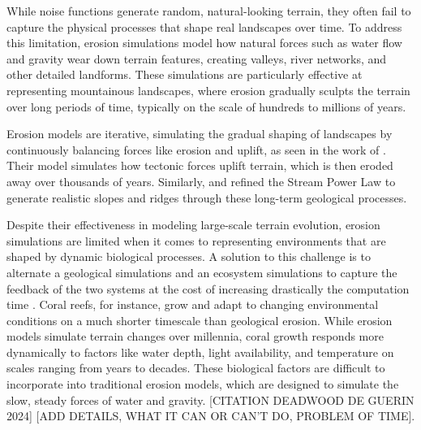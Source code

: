 While noise functions generate random, natural-looking terrain, they often fail to capture the physical processes that shape real landscapes over time. To address this limitation, erosion simulations model how natural forces such as water flow and gravity wear down terrain features, creating valleys, river networks, and other detailed landforms. These simulations are particularly effective at representing mountainous landscapes, where erosion gradually sculpts the terrain over long periods of time, typically on the scale of hundreds to millions of years.

Erosion models are iterative, simulating the gradual shaping of landscapes by continuously balancing forces like erosion and uplift, as seen in the work of \cite{Cordonnier2016,Cordonnier2017a}. Their model simulates how tectonic forces uplift terrain, which is then eroded away over thousands of years. Similarly, \cite{Schott2023} and \cite{Tzathas2024} refined the Stream Power Law to generate realistic slopes and ridges through these long-term geological processes.

Despite their effectiveness in modeling large-scale terrain evolution, erosion simulations are limited when it comes to representing environments that are shaped by dynamic biological processes. A solution to this challenge is to alternate a geological simulations and an ecosystem simulations to capture the feedback of the two systems at the cost of increasing drastically the computation time \cite{Cordonnier2017b}. Coral reefs, for instance, grow and adapt to changing environmental conditions on a much shorter timescale than geological erosion. While erosion models simulate terrain changes over millennia, coral growth responds more dynamically to factors like water depth, light availability, and temperature on scales ranging from years to decades. These biological factors are difficult to incorporate into traditional erosion models, which are designed to simulate the slow, steady forces of water and gravity. [CITATION DEADWOOD DE GUERIN 2024] [ADD DETAILS, WHAT IT CAN OR CAN'T DO, PROBLEM OF TIME].

